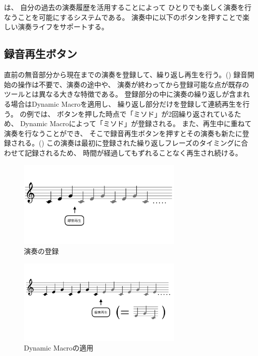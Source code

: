 %
%
\section{\system}
\label{repiano}

{\system}は、
自分の過去の演奏履歴を活用することによって
ひとりでも楽しく演奏を行なうことを可能にするシステムである。
演奏中に以下のボタンを押すことで楽しい演奏ライフをサポートする。

\subsection{録音再生ボタン}
\label{recplaybutton}

直前の無音部分から現在までの演奏を登録して、繰り返し再生を行う。()
録音開始の操作は不要で、演奏の途中や、
演奏が終わってから登録可能な点が既存のツールとは異なる大きな特徴である。
登録部分の中に演奏の繰り返しが含まれる場合はDynamic Macro\cite{masui}を適用し、
繰り返し部分だけを登録して連続再生を行う。
の例では、
ボタンを押した時点で「ミソド」が2回繰り返されているため、
Dynamic Macroによって「ミソド」が登録される。
また、再生中に重ねて演奏を行なうことができ、
そこで録音再生ボタンを押すとその演奏も新たに登録される。()
この演奏は最初に登録された繰り返しフレーズのタイミングに合わせて記録されるため、
時間が経過してもずれることなく再生され続ける。

\begin{figure}[tb]
\includegraphics[width=8cm,bb=0 0 1054 481]{images/rp1.png}
\centering
\caption{演奏の登録}
\label{recplay1}
\end{figure}

\begin{figure}[tb]
\includegraphics[width=8cm,bb=0 0 1054 481]{images/rp2.png}
\centering
\caption{Dynamic Macroの適用}
\label{recplay2}
\end{figure}

